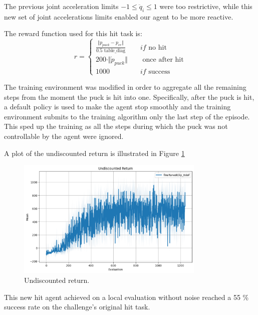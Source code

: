 The previous joint acceleration limits $-1 \le \ddot{q}_i \le 1$ were too restrictive, 
while this new set of joint accelerations limits enabled our agent to be more reactive.

The reward function used for this hit task is:
\begin{equation}
    r = \left\{
        \begin{aligned}
            \frac{\Vert p_{puck} - p_{ee} \Vert}{0.5 \text{ table\_diag}} \quad &if \text{ no hit} \\
            200 \cdot \Vert \dot{p}_{puck} \Vert \quad &\text{ once after hit} \\
            1000 \quad &if \text{ success}
        \end{aligned}
    \right.
\end{equation}

The training environment was modified in order to aggregate all the remaining steps from the moment the puck is hit into one. Specifically, after the puck
is hit, a default policy is used to make the agent stop smoothly and the training environment submits to the training algorithm only the last step of the episode.
This sped up the training as all the steps during which the puck was not controllable by the agent were ignored.

A plot of the undiscounted return is illustrated in Figure \ref{fig:undiscounted_return}

\begin{figure}
    \centering
    \includegraphics[width=0.8\textwidth]{Images/undiscounted_return.pdf}
    \caption{Undiscounted return.}
    \label{fig:undiscounted_return}
\end{figure}

This new hit agent achieved on a local evaluation without noise reached a 55 \% success rate on the challenge's original hit task.

